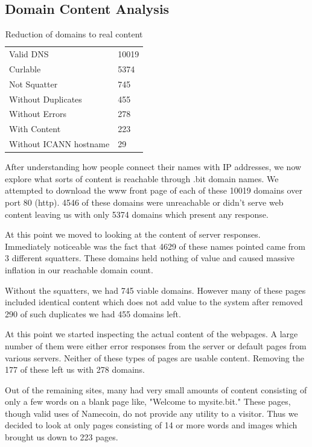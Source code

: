\subsection{Domain Content Analysis}
\label{domainbreakdown}

\begin{table}[t]
\begin{tabular}{ll}
Valid DNS          &  10019  \\
Curlable        & 5374     \\
Not Squatter        & 745     \\
Without Duplicates      & 455     \\
Without Errors              & 278    \\
With Content              & 223    \\
Without ICANN hostname   & 29   \\
\end{tabular}
\caption{Reduction of domains to real content}
\end{table}

After understanding how people connect their names with IP addresses, we now explore what sorts of content is reachable through .bit domain names. We attempted to download the www front page of each of these 10019 domains over port 80 (http). 4546 of these domains were unreachable or didn't serve web content leaving us with only 5374 domains which present any response.

At this point we moved to looking at the content of server responses. Immediately noticeable was the fact that 4629 of these names pointed came from 3 different squatters. These domains held nothing of value and caused massive inflation in our reachable domain count.

Without the squatters, we had 745 viable domains. However many of these pages included identical content which does not add value to the system after removed 290 of such duplicates we had 455 domains left.

At this point we started inspecting the actual content of the webpages. A large number of them were either error responses from the server or default pages from various servers. Neither of these types of pages are usable content. Removing the 177 of these left us with 278 domains.

Out of the remaining sites, many had very small amounts of content consisting of only a few words on a blank page like, "Welcome to mysite.bit." These pages, though valid uses of Namecoin, do not provide any utility to a visitor. Thus we decided to look at only pages consisting of 14 or more words and images which brought us down to 223 pages.

